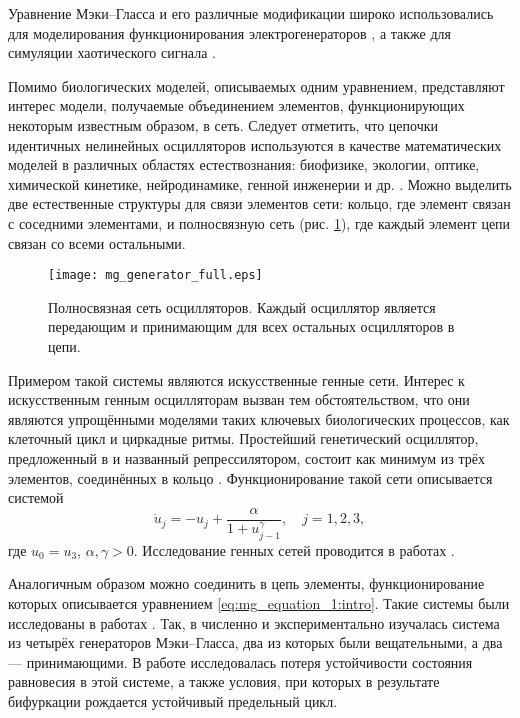 Уравнение Мэки--Гласса и его различные модификации широко использовались для моделирования функционирования электрогенераторов \cite{Tateno2012, Namajunas1995, Glyzin2018, Glyzin2018a}, а также для симуляции хаотического сигнала \cite{Grassberger1983, Amil2015, Amil2015a, Shahverdiev2006}.

Помимо биологических моделей, описываемых одним уравнением, представляют интерес модели, получаемые объединением элементов, функционирующих некоторым известным образом, в сеть. Следует отметить, что цепочки идентичных нелинейных осцилляторов используются в качестве математических моделей в различных областях естествознания: биофизике, экологии, оптике, химической кинетике, нейродинамике, генной инженерии и др. \cite{Glyzin2022}. Можно выделить две естественные структуры для связи элементов сети: кольцо, где элемент связан с соседними элементами, и полносвязную сеть (рис. \ref{fig:full_mesh:intro}), где каждый элемент цепи связан со всеми остальными.

\begin{figure}[ht]
	\centering
	\texttt{[image: mg\_generator\_full.eps]}
	\caption{Полносвязная сеть осцилляторов. Каждый осциллятор является передающим и принимающим для всех остальных осцилляторов в цепи.}
	\label{fig:full_mesh:intro}
\end{figure}

Примером такой системы являются искусственные генные сети. Интерес к искусственным генным осцилляторам вызван тем обстоятельством, что они являются упрощёнными моделями таких ключевых биологических процессов, как клеточный цикл и циркадные ритмы. Простейший генетический осциллятор, предложенный в \cite{Elowitz2000} и названный репрессилятором, состоит как минимум из трёх элементов, соединённых в кольцо \cite{Glyzin2017, GlyzinBook2018}. Функционирование такой сети описывается системой
\begin{equation}
	\label{eq:intro:repressilator}
	\dot{u}_j = -u_j + \dfrac{\alpha}{1 + u^{\gamma}_{j - 1}}, \quad j = 1, 2, 3,
\end{equation}
где $u_0 = u_3$, $\alpha, \gamma > 0$. Исследование генных сетей проводится в работах \cite{Likhoshvaj2003, Volokitin2004, Golubyatnikov2006, Buse2009, Buse2010}.

Аналогичным образом можно соединить в цепь элементы, функционирование которых описывается уравнением \eqref{eq:mg_equation_1:intro}. Такие системы были исследованы в работах \cite{Preobrazhenskaia2021, Tateno2012, Sano2007, Wan2009}. Так, в \cite{Sano2007} численно и экспериментально изучалась система из четырёх генераторов Мэки--Гласса, два из которых были вещательными, а два --- принимающими. В работе \cite{Wan2009} исследовалась потеря устойчивости состояния равновесия в этой системе, а также условия, при которых в результате бифуркации рождается устойчивый предельный цикл.


